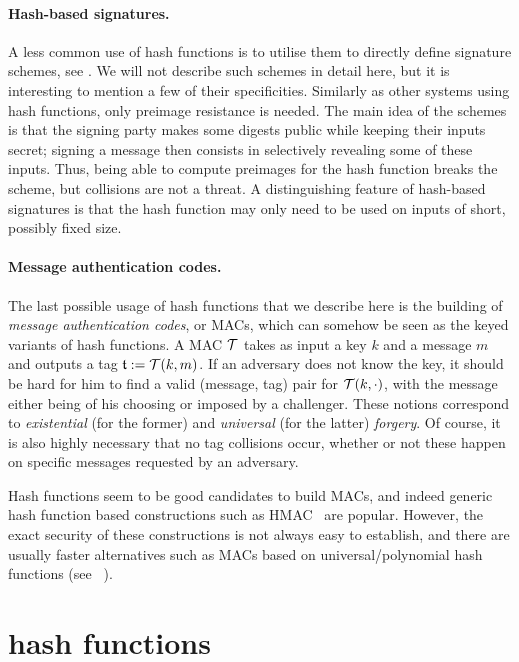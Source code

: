 \paragraph{Hash-based signatures.} A less common use of hash functions is to utilise them to directly define signature schemes, see \eg \cite{DBLP:conf/crypto/Merkle87}. We will not describe such schemes in detail
here, but it is interesting to mention a few of their specificities. Similarly as other systems using hash functions, only preimage resistance is needed. The main
idea of the schemes is that the signing party makes some digests public while keeping their inputs secret; signing a message then consists in selectively revealing some of
these inputs. Thus, being able to compute preimages for the hash function breaks the scheme, but collisions are not a threat.
A distinguishing feature of hash-based signatures is that the hash function may only need to be used on inputs of short, possibly fixed size. 

\paragraph{Message authentication codes.} The last possible usage of hash functions that we describe here is the building of \emph{message authentication codes}, or MACs, which
can somehow be seen as the keyed variants of hash functions. A MAC $\operatorname{\mathcal{T}}$ takes as input a key $k$ and a message $m$ and outputs a tag $\mathfrak{t} := \operatorname{\mathcal{T}}(k, m)$.
If an adversary does not know the key, it should be hard for him to find a valid (message, tag) pair for $\operatorname{\mathcal{T}}(k, \cdot)$, with the message either being of his choosing
or imposed by a challenger. These notions correspond to \emph{existential} (for the former) and \emph{universal} (for the latter) \emph{forgery}. Of course, it is also
highly necessary that no tag collisions occur, whether or not these happen on specific messages requested by an adversary.

Hash functions seem to be good candidates to build MACs, and indeed generic hash function based constructions such as HMAC~\cite{DBLP:conf/crypto/BellareCK96} are popular. However, the exact security of
these constructions is not always easy to establish, and there are usually faster alternatives such as MACs based on universal/polynomial hash functions (see \eg~\cite{DBLP:conf/crypto/BlackHKKR99}).

\section{\merkdam hash functions}
\label{sec:mdhf}

